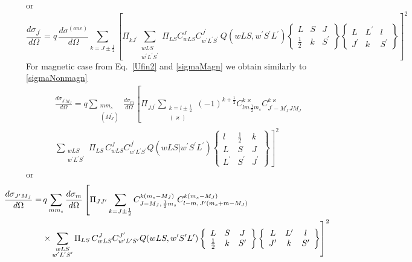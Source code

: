 \documentclass[a4paper,oneside,12pt]{extarticle}
\begin{document}
%
or
%
\begin{equation}
\frac{d \sigma_{J^{\prime}}}{d \Omega} = q \, \frac{d \sigma^{(one)}}{d \Omega}
\sum_{k=J\pm\frac{1}{2}} \left[ \Pi_{kJ^{\prime}}
\sum_{\substack{wLS\\w^{\prime}L^{\prime} S^{\prime}}} \Pi_{LS}
 C^{J}_{wLS} C^{J^{\prime}}_{w^{\prime}L^{\prime} S^{\prime}} \,
Q(wLS, w^{\prime}S^{\prime}L^{\prime}) 
\left \{
\begin{array}{ccc}
L & S & J \\
\frac{1}{2} & k & S^{\prime}
\end{array}
\right \}
\left \{
\begin{array}{ccc}
L & L^{\prime} & l \\
J^{\prime} & k & S^{\prime}
\end{array}
\right \}
\right]^2 
\,
\end{equation}
%
%
For magnetic case from Eq.~\ref{Ufin2} and \ref{sigmaMagn} we obtain similarly to \ref{sigmaNonmagn}
\begin{multline}
\frac{d \sigma_{J^{\prime} M_J}}{d \Omega} =
q \sum_{\substack{m m_s\\(M_J^{\prime})}} \frac{d \sigma_m}{d \Omega}
\left[ \Pi_{JJ^{\prime}} 
\sum_{\substack{k=l\pm\frac{1}{2}\\ (\varkappa)}} (-1)^{k+\frac{1}{2}} 
C^{k \varkappa}_{lm \, \frac{1}{2}m_s}
C^{k \varkappa}_{J^{\prime} -M_J^{\prime} \, J M_J} 
\right. \\ \left. 
\sum_{\substack{wLS\\w^{\prime}L^{\prime} S^{\prime}}}  
\Pi_{LS} \,
C^{J}_{wLS} C^{J^{\prime}}_{w^{\prime}L^{\prime} S^{\prime}}
Q(wLS | w^{\prime}S^{\prime}L^{\prime}) 
\left \{
\begin{array}{ccc}
l & \frac{1}{2} & k \\[2mm]
L & S & J \\[2mm]
L^{\prime} & S^{\prime} & J^{\prime}
\end{array}
\right \} \right]^2
\end{multline}
%
or
%
\begin{equation}
\hspace{-1cm}
\begin{split}
\frac{d \sigma_{J^{\prime} M_J}}{d \Omega} = & \,
q \sum_{m m_s} \frac{d \sigma_m}{d \Omega} 
\left[ \Pi_{JJ^{\prime}} 
\sum_{k=J\pm\frac{1}{2}} C^{k (m_s-M_J)}_{J -M_J, \, \frac{1}{2}m_s}
C^{k (m_s-M_J)}_{l -m, \, J^{\prime} (m_s+m-M_J)} 
\right. \\ & \left. \times
\sum_{\substack{wLS\\w^{\prime}L^{\prime} S^{\prime}}}  
\Pi_{LS} \,
C^{J}_{wLS} C^{J^{\prime}}_{w^{\prime}L^{\prime} S^{\prime}}
Q(wLS, w^{\prime}S^{\prime}L^{\prime}) 
\left \{
\begin{array}{ccc}
L & S & J \\
\frac{1}{2} & k & S^{\prime}
\end{array}
\right \}
\left \{
\begin{array}{ccc}
L & L^{\prime} & l \\
J^{\prime} & k & S^{\prime}
\end{array}
\right \}
\right]^2
\end{split}
\end{equation}
\end{document}
